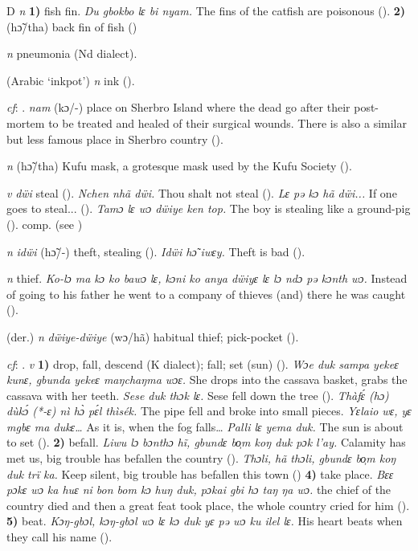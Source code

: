 \begin{letter}{D}
 \textit{n} \textbf{1)} fish fin. \textit{Du gbokbo lɛ bi nyam.} The fins of the catfish are poisonous (\citealt{Pichl1967}). \textbf{2)} (hɔ̃/tha) back fin of fish (\citealt{Pichl1967})

 \textit{n} pneumonia (Nd dialect). 

 (Arabic ‘inkpot') \textit{n} ink (\citealt{Pichl1967}). 

 \textit{cf}: . \textit{nam} (kɔ/-) place on Sherbro Island where the dead go after their post-mortem to be treated and healed of their surgical wounds. There is also a similar but less famous place in Sherbro country (\citealt{Pichl1967}). 

 \textit{n} (hɔ̃/tha) Kufu mask, a grotesque mask used by the Kufu Society (\citealt{Pichl1967}). 

 \textit{v} \textit{dẅi} steal (\citealt{Pichl1967}). \textit{Nchen nhã dẅi.} Thou shalt not steal (\citealt{Pichl1967}). \textit{Lɛ pə kɔ hã dẅi...} If one goes to steal... (\citealt{Pichl1967}). \textit{Tamɔ lɛ wɔ dẅiye ken top.} The boy is stealing like a ground-pig (\citealt{Pichl1967}). comp.  (see ) 

 \textit{n} \textit{idẅi} (hɔ̃/-) theft, stealing (\citealt{Pichl1967}). \textit{Idẅi hɔ̃ iwɛy.} Theft is bad (\citealt{Pichl1967}). 

 \textit{n} thief. \textit{Ko-lɔ ma kɔ ko bawɔ lɛ, kɔni ko anya dẅiyɛ lɛ lɔ ndɔ pə kɔnth wɔ.} Instead of going to his father he went to a company of thieves (and) there he was caught (\citealt{Pichl1967}). 

 (der.) \textit{n} \textit{dẅiye-dẅiye} (wɔ/hã) habitual thief; pick-pocket (\citealt{Pichl1967}). 

 \textit{cf}: . \textit{v} \textbf{1)} drop, fall, descend (K dialect); fall; set (sun) (\citealt{Pichl1967}). \textit{Wɔe duk sampa yekeɛ kunɛ, gbunda yekeɛ maŋchaŋma wɔɛ.} She drops into the cassava basket, grabs the cassava with her teeth. \textit{Sese duk thɔk lɛ.} Sese fell down the tree (\citealt{Pichl1967}). \textit{Thàfɛ́ (hɔ) dùkɔ́ (*-ɛ) nì hɔ̀ pɛ́l thìsék.} The pipe fell and broke into small pieces. \textit{Yɛlaio wɛ, yɛ mgbɛ ma dukɛ…} As it is, when the fog falls… \textit{Palli lɛ yema duk.} The sun is about to set (\citealt{Pichl1967}). \textbf{2)} befall. \textit{Liwu lɔ bɔnthɔ hĩ, gbundɛ bo̹m koŋ duk pɔk l'ay.} Calamity has met us, big trouble has befallen the country (\citealt{Pichl1967}). \textit{Thɔli, hã thɔli, gbundɛ bo̹m koŋ duk trï ka.} Keep silent, big trouble has befallen this town (\citealt{Pichl1967}) \textbf{4)} take place. \textit{Bɛɛ pɔkɛ wɔ ka huɛ ni bon bom kɔ huŋ duk, pɔkai gbi hɔ taŋ ŋa wɔ.} the chief of the country died and then a great feat took place, the whole country cried for him (\citealt{Sumner1921}). \textbf{5)} beat. \textit{Kɔŋ-gbɔl, kɔŋ-gbɔl wɔ lɛ kɔ duk yɛ pə wɔ ku ilel lɛ.} His heart beats when they call his name (\citealt{Pichl1967}). 


\end{letter}
